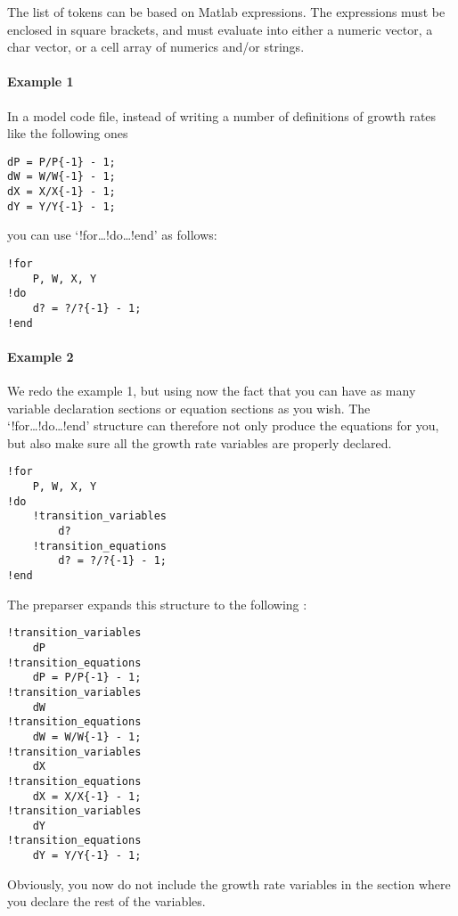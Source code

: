 The list of tokens can be based on Matlab expressions. The expressions
must be enclosed in square brackets, and must evaluate into either a
numeric vector, a char vector, or a cell array of numerics and/or
strings.

\paragraph{Example 1}\label{example-1}

In a model code file, instead of writing a number of definitions of
growth rates like the following ones

\begin{verbatim}
dP = P/P{-1} - 1;
dW = W/W{-1} - 1;
dX = X/X{-1} - 1;
dY = Y/Y{-1} - 1;
\end{verbatim}

you can use `!for\ldots{}!do\ldots{}!end' as follows:

\begin{verbatim}
!for
    P, W, X, Y
!do
    d? = ?/?{-1} - 1;
!end
\end{verbatim}

\paragraph{Example 2}\label{example-2}

We redo the example 1, but using now the fact that you can have as many
variable declaration sections or equation sections as you wish. The
`!for\ldots{}!do\ldots{}!end' structure can therefore not only produce
the equations for you, but also make sure all the growth rate variables
are properly declared.

\begin{verbatim}
!for
    P, W, X, Y
!do
    !transition_variables
        d?
    !transition_equations
        d? = ?/?{-1} - 1;
!end
\end{verbatim}

The preparser expands this structure to the following :

\begin{verbatim}
!transition_variables
    dP
!transition_equations
    dP = P/P{-1} - 1;
!transition_variables
    dW
!transition_equations
    dW = W/W{-1} - 1;
!transition_variables
    dX
!transition_equations
    dX = X/X{-1} - 1;
!transition_variables
    dY
!transition_equations
    dY = Y/Y{-1} - 1;
\end{verbatim}

Obviously, you now do not include the growth rate variables in the
section where you declare the rest of the variables.

